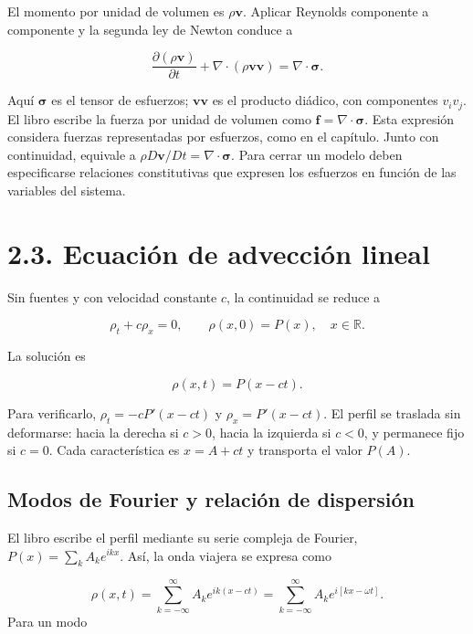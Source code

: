 \documentclass[11pt,a4paper]{article}
\begin{document}
El momento por unidad de volumen es \(\rho\mathbf v\). Aplicar Reynolds
componente a componente y la segunda ley de Newton conduce a

\[\frac{\partial(\rho\mathbf v)}{\partial t}+\nabla\cdot(\rho\mathbf v\mathbf v)=\nabla\cdot\boldsymbol\sigma.\tag{2.18}\]

Aquí \(\boldsymbol\sigma\) es el tensor de esfuerzos;
\(\mathbf v\mathbf v\) es el producto diádico, con componentes
\(v_i v_j\). El libro escribe la fuerza por unidad de volumen como
\(\mathbf f=\nabla\cdot\boldsymbol\sigma\). Esta expresión considera
fuerzas representadas por esfuerzos, como en el capítulo. Junto con
continuidad, equivale a
\(\rho D\mathbf v/Dt=\nabla\cdot\boldsymbol\sigma\). Para cerrar un
modelo deben especificarse relaciones constitutivas que expresen los
esfuerzos en función de las variables del sistema.

\hypertarget{ecuaciuxf3n-de-advecciuxf3n-lineal}{%
\section{2.3. Ecuación de advección
lineal}\label{ecuaciuxf3n-de-advecciuxf3n-lineal}}

Sin fuentes y con velocidad constante \(c\), la continuidad se reduce a

\[\rho_t+c\rho_x=0,\qquad \rho(x,0)=P(x),\quad x\in\mathbb R.\]

La solución es

\[\boxed{\rho(x,t)=P(x-ct).}\tag{2.20}\]

Para verificarlo, \(\rho_t=-cP'(x-ct)\) y \(\rho_x=P'(x-ct)\). El perfil
se traslada sin deformarse: hacia la derecha si \(c>0\), hacia la
izquierda si \(c<0\), y permanece fijo si \(c=0\). Cada característica
es \(x=A+ct\) y transporta el valor \(P(A)\).

\hypertarget{modos-de-fourier-y-relaciuxf3n-de-dispersiuxf3n}{%
\subsection{Modos de Fourier y relación de
dispersión}\label{modos-de-fourier-y-relaciuxf3n-de-dispersiuxf3n}}

El libro escribe el perfil mediante su serie compleja de Fourier,
\(P(x)=\sum_k A_ke^{ikx}\). Así, la onda viajera se expresa como

\[\rho(x,t)=\sum_{k=-\infty}^{\infty}A_ke^{ik(x-ct)}=\sum_{k=-\infty}^{\infty}A_ke^{i[kx-\omega t]}.\tag{2.21}\]
Para un modo
\end{document}
